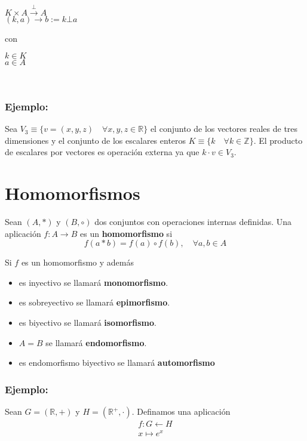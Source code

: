 \documentclass[0_algebra.tex]{subfiles}
\begin{document}
\begin{minipage}{0.5\textwidth}
\begin{center}
$K\times A \overset{\bot}{\rightarrow} A$\\
$(k,a) \rightarrow b:=k\bot a$
\end{center}
\end{minipage} con
\quad
\begin{minipage}{0.4\textwidth}
$k\in K$\\
$a\in A$
\end{minipage}\\

\subsubsection*{Ejemplo:}

Sea $V_3 \equiv \lbrace v=(x,y,z)\quad \forall x,y,z \in \mathbb{R}\rbrace$ el conjunto de los vectores reales de tres dimensiones y el conjunto de los escalares enteros  $K\equiv \lbrace k\quad \forall k \in \mathbb{Z}\rbrace$. El producto de escalares por vectores es operación externa ya que $k\cdot v \in V_3$.

\section{Homomorfismos}
Sean $(A,*)$ y $(B,\circ)$ dos conjuntos con operaciones internas definidas. Una aplicación $f: A \rightarrow B$ es un \textbf{homomorfismo} si
$$
f(a*b)=f(a)\circ f(b), \quad \forall a,b \in A
$$

Si $f$ es un homomorfismo y además
\begin{itemize}
\item es inyectivo se llamará \textbf{monomorfismo}.
\item es sobreyectivo se llamará \textbf{epimorfismo}.
\item es biyectivo se llamará \textbf{isomorfismo}.
\item $A=B$ se llamará \textbf{endomorfismo}.
\item es endomorfismo biyectivo se llamará \textbf{automorfismo}
\end{itemize}



\subsubsection*{Ejemplo:}
Sean $G=(\mathbb{R},+)$ y $H=(\mathbb{R}^+,\cdot)$. Definamos una aplicación
$$
\begin{matrix}
f:G\leftarrow H\\
x \mapsto e^x
\end{matrix}
$$
\end{document}
